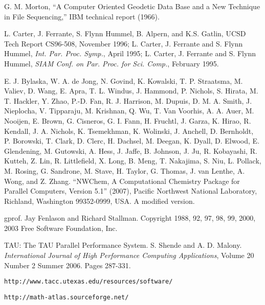 \documentclass[aps,preprint,groupedaddress]{revtex4-1}
\begin{document}
\begin{thebibliography}{99}

G. M. Morton, ``A Computer Oriented Geodetic Data Base and a New Technique in File Sequencing,'' IBM technical report (1966).

L. Carter, J. Ferrante, S. Flynn Hummel, B. Alpern, and K.S. Gatlin, UCSD Tech Report CS96-508, November 1996;
L. Carter, J. Ferrante and S. Flynn Hummel, \textit{Int. Par. Proc. Symp.}, April 1995;
L. Carter, J. Ferrante and S. Flynn Hummel, \textit{SIAM Conf. on Par. Proc. for Sci. Comp.}, February 1995.

E. J. Bylaska, W. A. de Jong, N. Govind, K. Kowalski, T. P. Straatsma, M. Valiev, D. Wang, E. Apra, T. L. Windus, J. Hammond, P. Nichols, S. Hirata, M. T. Hackler, Y. Zhao, P.-D. Fan, R. J. Harrison, M. Dupuis, D. M. A. Smith, J. Nieplocha, V. Tipparaju, M. Krishnan, Q. Wu, T. Van Voorhis, A. A. Auer, M. Nooijen, E. Brown, G. Cisneros, G. I. Fann, H. Fruchtl, J. Garza, K. Hirao, R. Kendall, J. A. Nichols, K. Tsemekhman, K. Wolinski, J. Anchell, D. Bernholdt, P. Borowski, T. Clark, D. Clerc, H. Dachsel, M. Deegan, K. Dyall, D. Elwood, E. Glendening, M. Gutowski, A. Hess, J. Jaffe, B. Johnson, J. Ju, R. Kobayashi, R. Kutteh, Z. Lin, R. Littlefield, X. Long, B. Meng, T. Nakajima, S. Niu, L. Pollack, M. Rosing, G. Sandrone, M. Stave, H. Taylor, G. Thomas, J. van Lenthe, A. Wong, and Z. Zhang. ``NWChem, A Computational Chemistry Package for Parallel Computers, Version 5.1'' (2007), Pacific Northwest National Laboratory, Richland, Washington 99352-0999, USA.  A modified version.

gprof.  Jay Fenlason and Richard Stallman.  Copyright 1988, 92, 97, 98, 99, 2000, 2003 Free Software Foundation, Inc.

TAU: The TAU Parallel Performance System.  S. Shende and A. D. Malony. \textit{International Journal of High Performance Computing Applications}, Volume 20 Number 2 Summer 2006. Pages 287-331.

\texttt{http://www.tacc.utexas.edu/resources/software/}

\texttt{http://math-atlas.sourceforge.net/}


\end{thebibliography}
\end{document}

